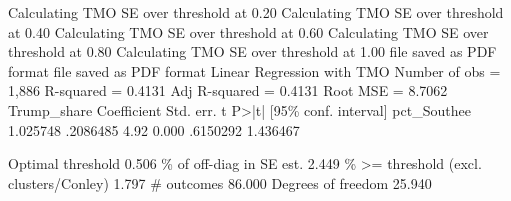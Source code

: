 Calculating TMO SE over threshold at 0.20
Calculating TMO SE over threshold at 0.40
Calculating TMO SE over threshold at 0.60
Calculating TMO SE over threshold at 0.80
Calculating TMO SE over threshold at 1.00
file{} saved as PDF format
file{} saved as PDF format
{\smallskip}
Linear Regression with TMO                              Number of obs =  1,886
                                                        R-squared     = 0.4131
                                                        Adj R-squared = 0.4131
                                                        Root MSE      = 8.7062
{\smallskip}
 Trump_share {\VBAR} Coefficient  Std. err.      t    P>|t|     [95\% conf. interval]
pct_Southe{\tytilde}e {\VBAR}   1.025748   .2086485     4.92   0.000     .6150292    1.436467
                                                                               
                                                   Optimal threshold      0.506
                                            \% of off-diag in SE est.      2.449
                              \% >= threshold (excl. clusters/Conley)      1.797
                                                          \# outcomes     86.000
                                                  Degrees of freedom     25.940
